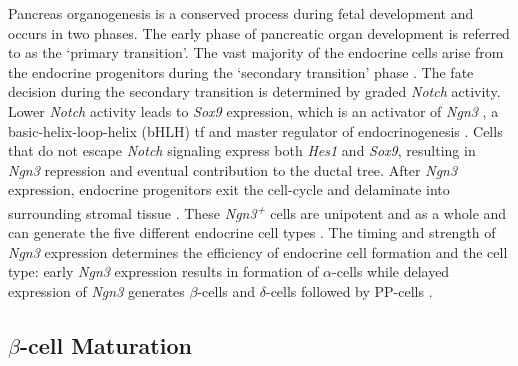 Pancreas organogenesis is a conserved process during fetal development and occurs in two phases. The early phase of pancreatic organ development is referred to as the `primary transition'. The vast majority of the endocrine cells arise from the endocrine progenitors during the `secondary transition' phase \textbf{\cite{pan_pancreas_2011}}. The fate decision during the secondary transition is determined by graded \textit{Notch} activity. Lower \textit{Notch} activity leads to \textit{Sox9} expression, which is an activator of \textit{Ngn3} \textbf{\cite{shih_pancreas_2013}}, a basic-helix-loop-helix (bHLH) \gls{tf} and master regulator of endocrinogenesis \textbf{\cite{gu_direct_2002}}. Cells that do not escape \textit{Notch} signaling express both \textit{Hes1} and \textit{Sox9}, resulting in \textit{Ngn3} repression and eventual contribution to the ductal tree. After \textit{Ngn3} expression, endocrine progenitors exit the cell-cycle and delaminate into surrounding stromal tissue \textbf{\cite{shih_pancreas_2013, gouzi_neurogenin3_2011, miyatsuka_neurogenin3_2011}}. These \textit{Ngn3\textsuperscript{+}} cells are unipotent and as a whole and can generate the five different endocrine cell types \textbf{\cite{shih_pancreas_2013,gu_direct_2002,miyatsuka_neurogenin3_2011}}. The timing and strength of \textit{Ngn3} expression determines the efficiency of endocrine cell formation and the cell type: early \textit{Ngn3} expression results in formation of $\alpha$-cells while delayed expression of \textit{Ngn3} generates $\beta$-cells and $\delta$-cells followed by PP-cells \textbf{\cite{johansson_temporal_2007}}.



\subsection[$\beta$-cell Maturation]{$\beta$-cell Maturation} %
\label{sec:betamat}


